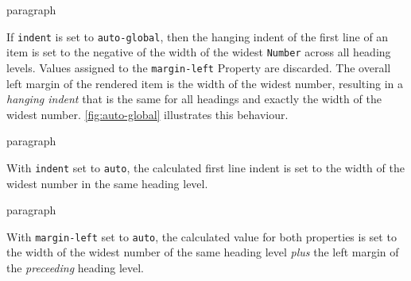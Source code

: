 \begin{heading}{paragraph}
\end{heading}


\begin{tpFigure}[float-pos=t!]
  \label{fig:auto-global}
\end{tpFigure}

If \lstinline{indent} is set to \lstinline{auto-global}, then the
hanging indent of the first line of an item is set to the negative of
the width of the widest \lstinline{Number} across all heading
levels. Values assigned to the \lstinline{margin-left} Property are
discarded. The overall left margin of the rendered item is the width
of the widest number, resulting in a \textit{hanging indent} that is
the same for all headings and exactly the width of the widest
number. \ref{fig:auto-global} illustrates this behaviour.

\begin{heading}{paragraph}
\end{heading}

With \lstinline{indent} set to \lstinline{auto}, the calculated first
line indent is set to the width of the widest number in the same
heading level.

\begin{heading}{paragraph}
\end{heading}

With \lstinline{margin-left} set to \lstinline{auto}, the calculated
value for both properties is set to the width of the widest number of
the same heading level \textit{plus} the left margin of the
\textit{preceeding} heading level.

